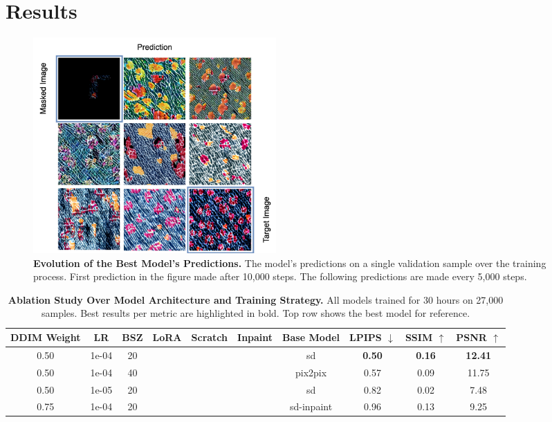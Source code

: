 \documentclass[11pt,twocolumn]{article}
\newcommand{\cmark}{\checkmark}
\newcommand{\xmark}{\ding{55}}
\begin{document}
\section{Results}
\begin{figure}[t]
  \centering
  \includegraphics[width=0.45\textwidth]{figures/pbr_test_overview.png}
  \caption{\textbf{Evolution of the Best Model's Predictions.} 
  The model's predictions on a single validation sample over the training process. First prediction in the figure made 
  after 10,000 steps. The following predictions are made every 5,000 steps.}
  \label{fig:test-overview}
\end{figure}

\begin{table}[t]
  \centering
    \begin{tabular}{ccccccc|ccc}
    \toprule
    \textbf{DDIM Weight} & \textbf{LR} & \textbf{BSZ} & \textbf{LoRA} & \textbf{Scratch} & \textbf{Inpaint} & \textbf{Base Model} & \textbf{LPIPS} $\downarrow$ & \textbf{SSIM} $\uparrow$ & \textbf{PSNR} $\uparrow$ \\
    \midrule
    0.50 & 1e-04 & 20 & \xmark & \xmark & \xmark & sd & \textbf{0.50} & \textbf{0.16} & \textbf{12.41} \\
    \midrule
    0.50 & 1e-04 & 40 & \cmark & \xmark & \xmark & pix2pix & 0.57 & 0.09 & 11.75 \\
    0.50 & 1e-05 & 20 & \xmark & \cmark & \xmark & sd & 0.82 & 0.02 & 7.48 \\
    \midrule
    0.75 & 1e-04 & 20 & \cmark & \xmark & \cmark & sd-inpaint & 0.96 & 0.13 & 9.25 \\

    \bottomrule
    \end{tabular}
    \caption{\textbf{Ablation Study Over Model Architecture and Training Strategy.} 
    All models trained for 30 hours on 27,000 samples. Best results per metric are highlighted in bold. 
    Top row shows the best model for reference.}
    \label{tab:arch-ablation}
\end{table}
\end{document}
